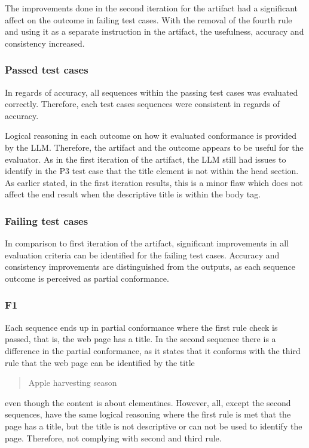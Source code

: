 The improvements done in the second iteration for the artifact had a significant affect on the outcome in failing test cases. With the removal of the fourth rule and using it as a separate instruction in the artifact, the usefulness, accuracy and consistency increased.

\subsubsection{Passed test cases}

In regards of accuracy, all sequences within the passing test cases was evaluated correctly. Therefore, each test cases sequences were consistent in regards of accuracy.

Logical reasoning in each outcome on how it evaluated conformance is provided by the LLM. Therefore, the artifact and the outcome appears to be useful for the evaluator. As in the first iteration of the artifact, the LLM still had issues to identify in the P3 test case that the title element is not within the head section. As earlier stated, in the first iteration results, this is a minor flaw which does not affect the end result when the descriptive title is within the body tag.

\subsubsection{Failing test cases}

In comparison to first iteration of the artifact, significant improvements in all evaluation criteria can be identified for the failing test cases. Accuracy and consistency improvements are distinguished from the outputs, as each sequence outcome is perceived as partial conformance. 

\subsubsection{F1}

Each sequence ends up in partial conformance where the first rule check is passed, that is, the web page has a title. In the second sequence there is a difference in the partial conformance, as it states that it conforms with the third rule that the web page can be identified by the title \blockquote{Apple harvesting season} even though the content is about clementines. However, all, except the second sequences, have the same logical reasoning where the first rule is met that the page has a title, but the title is not descriptive or can not be used to identify the page. Therefore, not complying with second and third rule.

